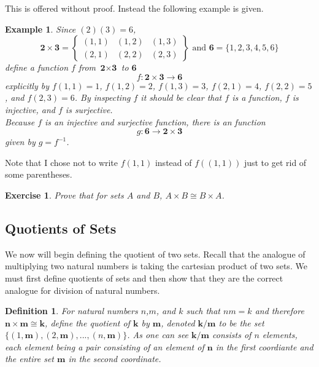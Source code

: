 \documentclass{article}
\theoremstyle{problemstyle}
\newtheorem{example}{Example}
\newtheorem{exercise}{Exercise}
\newtheorem{definition}{Definition}
\begin{document}
This is offered without proof. Instead the following example is given.

\begin{example}
Since $(2)(3) = 6$, 
$$\textbf{2} \times \textbf{3} = 
\left\{ \begin{array}{lll}
         (1,1) & (1,2) & (1,3)\\
         (2,1) & (2,2) & (2,3)\end{array} \right \} \text{ and } \textbf{6} = \{1,2,3,4,5,6\}$$ define a function $f$ from $\textbf{2} \times \textbf{3}$ to $\textbf{6}$ $$f:\textbf{2} \times \textbf{3} \rightarrow \textbf{6}$$ explicitly by $f(1,1) = 1$, $f(1,2) = 2$, $f(1,3) = 3$, $f(2,1) = 4$, $f(2,2) = 5$, and $f(2,3) = 6$.  By inspecting $f$ it should be clear that $f$ is a function, $f$ is injective, and $f$ is surjective. \\
         
Because $f$ is an injective and surjective function, there is an function $$g:\textbf{6} \rightarrow \textbf{2} \times \textbf{3}$$ given by $g = f^{-1}$. 
\end{example}

Note that I chose not to write $f(1,1)$ instead of $f((1,1))$ just to get rid of some parentheses.

\begin{exercise}
Prove that for sets $A$ and $B$, $A \times B \cong B \times A$.
\end{exercise}

\subsection*{Quotients of Sets}

We now will begin defining the quotient of two sets. Recall that the analogue of multiplying two natural numbers is taking the cartesian product of two sets. We must first define quotients of sets and then show that they are the correct analogue for division of natural numbers. 


\begin{definition}
For natural numbers $n$,$m$, and $k$ such that $nm=k$ and therefore $\textbf{n} \times \textbf{m} \cong \textbf{k}$,  define the quotient of $\textbf{k}$ by $\textbf{m}$, denoted $\textbf{k/m}$ to be the set $\{(1,\textbf{m}),(2,\textbf{m}),...,(n,\textbf{m})\}$.  As one can see $\textbf{k/m}$ consists of $n$ elements, each element being a pair consisting of an element of $\textbf{n}$ in the first coordiante and the entire set $\textbf{m}$ in the second coordinate. 
\end{definition}
\end{document}
